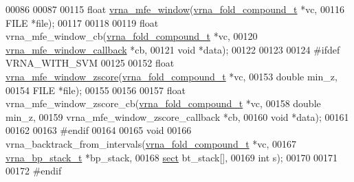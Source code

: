 \begin{DoxyCode}
00086 
00087 
00115 \textcolor{keywordtype}{float} \hyperlink{group__local__mfe__fold_ga689df235a1915a1ad56e377383c044ce}{vrna\_mfe\_window}(\hyperlink{group__fold__compound_structvrna__fc__s}{vrna\_fold\_compound\_t}  *vc,
00116                       FILE                  *file);
00117 
00118 
00119 \textcolor{keywordtype}{float} vrna\_mfe\_window\_cb(\hyperlink{group__fold__compound_structvrna__fc__s}{vrna\_fold\_compound\_t}     *vc,
00120                          \hyperlink{group__mfe__fold_ga4f3e5bc214ef803074ace313cb9571b4}{vrna\_mfe\_window\_callback} *cb,
00121                          \textcolor{keywordtype}{void}                     *data);
00122 
00123 
00124 \textcolor{preprocessor}{#ifdef VRNA\_WITH\_SVM}
00125 
00152 \textcolor{keywordtype}{float} \hyperlink{group__local__mfe__fold_gaa4f67ae94efd08d800c17f9b53423fd6}{vrna\_mfe\_window\_zscore}(\hyperlink{group__fold__compound_structvrna__fc__s}{vrna\_fold\_compound\_t} *vc,
00153                              \textcolor{keywordtype}{double}               min\_z,
00154                              FILE                 *file);
00155 
00156 
00157 \textcolor{keywordtype}{float} vrna\_mfe\_window\_zscore\_cb(\hyperlink{group__fold__compound_structvrna__fc__s}{vrna\_fold\_compound\_t}            *vc,
00158                                 \textcolor{keywordtype}{double}                          min\_z,
00159                                 vrna\_mfe\_window\_zscore\_callback *cb,
00160                                 \textcolor{keywordtype}{void}                            *data);
00161 
00162 
00163 \textcolor{preprocessor}{#endif}
00164 
00165 \textcolor{keywordtype}{void}
00166 vrna\_backtrack\_from\_intervals(\hyperlink{group__fold__compound_structvrna__fc__s}{vrna\_fold\_compound\_t}  *vc,
00167                               \hyperlink{group__data__structures_structvrna__bp__stack__s}{vrna\_bp\_stack\_t}       *bp\_stack,
00168                               \hyperlink{group__data__structures_structvrna__sect__s}{sect}                  bt\_stack[],
00169                               \textcolor{keywordtype}{int}                   s);
00170 
00171 
00172 \textcolor{preprocessor}{#endif}
\end{DoxyCode}
